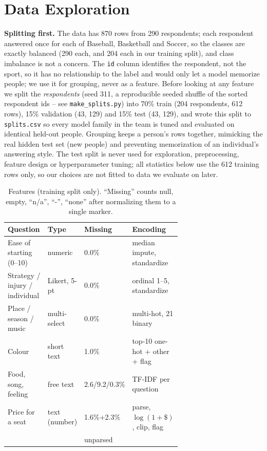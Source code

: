 \documentclass[12pt]{article}
\begin{document}
\section{Data Exploration}\label{sec:data-exploration}

\textbf{Splitting first.} The data has 870 rows from 290 respondents; each respondent answered
once for each of Baseball, Basketball and Soccer, so the classes are exactly balanced (290 each,
and 204 each in our training split), and class imbalance is not a concern. The \texttt{id} column
identifies the respondent, not the sport, so it has no relationship to the label and would only let
a model memorize people; we use it for grouping, never as a feature. Before looking at any feature
we split the \emph{respondents} (seed 311, a reproducible seeded shuffle of the sorted respondent
ids -- see \texttt{make\_splits.py}) into 70\% train (204 respondents, 612 rows), 15\% validation
(43, 129) and 15\% test (43, 129), and wrote this split to \texttt{splits.csv} so every model
family in the team is tuned and evaluated on identical held-out people. Grouping keeps a person's
rows together, mimicking the real hidden test set (new people) and preventing memorization of an
individual's answering style. The test split is never used for exploration, preprocessing, feature
design or hyperparameter tuning; all statistics below use the 612 training rows only, so our choices
are not fitted to data we evaluate on later.

\begin{table}[h]
\centering
\begin{tabularx}{\linewidth}{@{}L{0.29\linewidth}L{0.18\linewidth}L{0.20\linewidth}Y@{}}
\toprule
Question & Type & Missing & Encoding \\
\midrule
Ease of starting (0--10) & numeric & 0.0\% & median impute, standardize \\
Strategy / injury / individual & Likert, 5-pt & 0.0\% & ordinal 1--5, standardize \\
Place / season / music & multi-select & 0.0\% & multi-hot, 21 binary \\
Colour & short text & 1.0\% & top-10 one-hot + other + flag \\
Food, song, feeling & free text & 2.6/9.2/0.3\% & TF-IDF per question \\
Price for a seat & text (number) & 1.6\%+2.3\% & parse, $\log(1+\$)$, clip, flag \\&&unparsed&\\
\bottomrule
\end{tabularx}
\caption{Features (training split only). ``Missing'' counts null, empty, ``n/a'', ``-'', ``none''
after normalizing them to a single marker.}
\label{tab:features}
\end{table}
\end{document}
